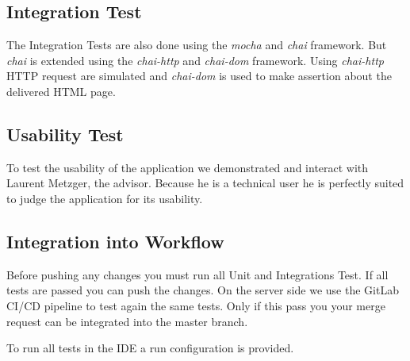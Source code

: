 \subsection{Integration Test}
The Integration Tests are also done using the \textit{mocha} and \textit{chai} framework.
But \textit{chai} is extended using the \textit{chai-http} and \textit{chai-dom} framework.
Using \textit{chai-http} HTTP request are simulated and \textit{chai-dom} is used to make assertion about the delivered HTML page.

\subsection{Usability Test}
To test the usability of the application we demonstrated and interact with Laurent Metzger, the advisor.
Because he is a technical user he is perfectly suited to judge the application for its usability.

\subsection{Integration into Workflow}
Before pushing any changes you must run all Unit and Integrations Test.
If all tests are passed you can push the changes.
On the server side we use the GitLab CI/CD pipeline to test again the same tests.
Only if this pass you your merge request can be integrated into the master branch.

To run all tests in the IDE a run configuration is provided.

